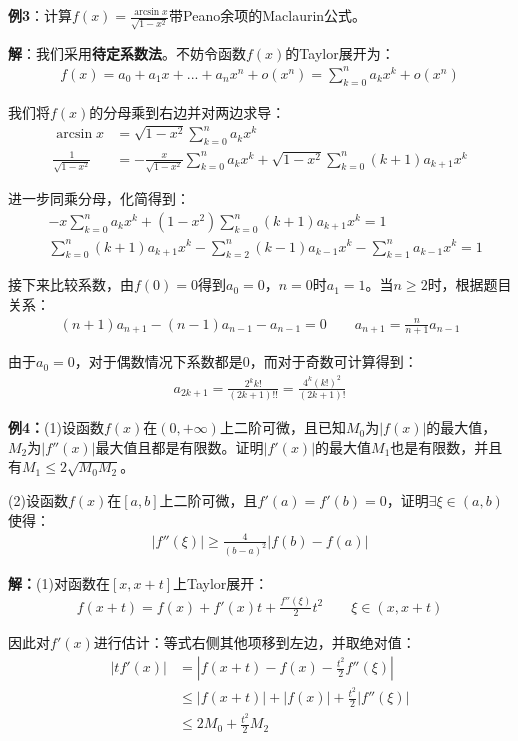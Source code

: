 \documentclass{ctexart}
\let\oldtextbf\textbf %
\renewcommand{\textbf}[1]{\textcolor{btex}{\oldtextbf{#1}}} %
\begin{document}
\textbf{例3}：计算$f(x)=\frac{\arcsin x}{\sqrt{1-x^2}}$带Peano余项的Maclaurin公式。

\textbf{解}：我们采用\textbf{待定系数法}。不妨令函数$f(x)$的Taylor展开为：
\begin{align*}
    f(x)=a_0+a_1x+...+a_nx^n+o(x^n)=\sum_{k=0}^n a_kx^k+o(x^n)
\end{align*}

我们将$f(x)$的分母乘到右边并对两边求导：
\begin{align*}
\arcsin x&=\sqrt{1-x^2}\sum_{k=0}^n a_kx^k \\
\frac{1}{\sqrt{1-x^2}}&=-\frac{x}{\sqrt{1-x^2}} \sum_{k=0}^n a_kx^k+\sqrt{1-x^2}\sum_{k=0}^{n}(k+1)a_{k+1}x^k   
\end{align*}

进一步同乘分母，化简得到：
\begin{align*}
&-x\sum_{k=0}^n a_kx^k+(1-x^2)\sum_{k=0}^{n}(k+1)a_{k+1}x^k  =1\\
&\sum_{k=0}^n(k+1)a_{k+1}x^k-\sum_{k=2}^n(k-1)a_{k-1}x^k-\sum_{k=1}^na_{k-1}x^k=1
\end{align*}

接下来比较系数，由$f(0)=0$得到$a_0=0$，$n=0$时$a_1=1$。当$n\geq 2$时，根据题目关系：
\begin{align*}
    (n+1)a_{n+1}-(n-1)a_{n-1}-a_{n-1}=0\qquad a_{n+1}=\frac{n}{n+1}a_{n-1}
\end{align*}

由于$a_0=0$，对于偶数情况下系数都是0，而对于奇数可计算得到：
\begin{align*}
    a_{2k+1}=\frac{2^kk!}{(2k+1)!!}=\frac{4^k(k!)^2}{(2k+1)!}
\end{align*}

\textbf{例4：}(1)设函数$f(x)$在$(0,+\infty)$上二阶可微，且已知$M_0$为$|f(x)|$的最大值，$M_2$为$|f''(x)|$最大值且都是有限数。证明$|f'(x)|$的最大值$M_1$也是有限数，并且有$M_1\leq 2\sqrt{M_0M_2}$。

(2)设函数$f(x)$在$[a,b]$上二阶可微，且$f'(a)=f'(b)=0$，证明$\exists \xi\in(a,b)$使得：
\begin{align*}
    |f''(\xi)|\geq \frac{4}{(b-a)^2}|f(b)-f(a)|
\end{align*}

\textbf{解：}(1)对函数在$[x,x+t]$上Taylor展开：
\begin{align*}
    f(x+t)=f(x)+f'(x)t+\frac{f''(\xi)}{2}t^2\qquad \xi\in(x,x+t)
\end{align*}

因此对$f'(x)$进行估计：等式右侧其他项移到左边，并取绝对值：
\begin{align*}
    |tf'(x)|&=|f(x+t)-f(x)-\frac{t^2}{2}f''(\xi)|\\
    &\leq |f(x+t)|+|f(x)|+\frac{t^2}{2}|f''(\xi)|\\
    &\leq 2M_0+\frac{t^2}{2}M_2
\end{align*}
\end{document}
